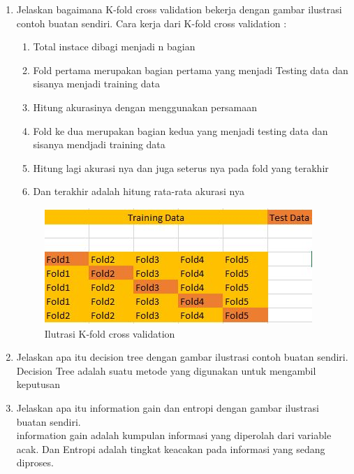 \begin{enumerate}
\item
Jelaskan bagaimana K-fold cross validation bekerja dengan gambar ilustrasi contoh buatan sendiri.
Cara kerja dari K-fold cross validation :
\begin{enumerate}
    \item Total instace dibagi menjadi n bagian
    \item Fold pertama merupakan bagian pertama yang menjadi Testing data dan sisanya menjadi training data
    \item Hitung akurasinya dengan menggunakan persamaan
    \item Fold ke dua merupakan bagian kedua yang menjadi testing data dan sisanya mendjadi training data
    \item Hitung lagi akurasi nya dan juga seterus nya pada fold yang terakhir
    \item Dan terakhir adalah hitung rata-rata akurasi nya
\end{enumerate}
\begin{figure}[!htbp]
    \centering
    \includegraphics[scale=0.5]{figures/K-fold.JPG}
	\caption{Ilutrasi K-fold cross validation}
\end{figure}


\item
Jelaskan apa itu decision tree dengan gambar ilustrasi contoh buatan sendiri.\\
Decision Tree adalah suatu metode yang digunakan untuk mengambil keputusan


\item
Jelaskan apa itu information gain dan entropi dengan gambar ilustrasi buatan sendiri.\\
information gain adalah kumpulan informasi yang diperolah dari variable acak. Dan Entropi adalah tingkat keacakan pada informasi yang sedang diproses.\\



\end{enumerate}

